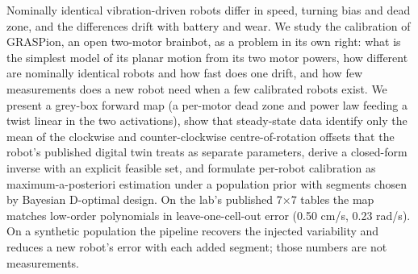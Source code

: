 Nominally identical vibration-driven robots differ in speed, turning
bias and dead zone, and the differences drift with battery and wear. We
study the calibration of GRASPion, an open two-motor brainbot, as a
problem in its own right: what is the simplest model of its planar
motion from its two motor powers, how different are nominally identical
robots and how fast does one drift, and how few measurements does a new
robot need when a few calibrated robots exist. We present a grey-box
forward map (a per-motor dead zone and power law feeding a twist linear
in the two activations), show that steady-state data identify only the
mean of the clockwise and counter-clockwise centre-of-rotation offsets
that the robot's published digital twin treats as separate parameters,
derive a closed-form inverse with an explicit feasible set, and
formulate per-robot calibration as maximum-a-posteriori estimation under
a population prior with segments chosen by Bayesian D-optimal design.
On the lab's published 7×7 tables the map matches low-order polynomials
in leave-one-cell-out error (0.50 cm/s, 0.23 rad/s). On a synthetic
population the pipeline recovers the injected variability and reduces a
new robot's error with each added segment; those numbers are not
measurements. 
